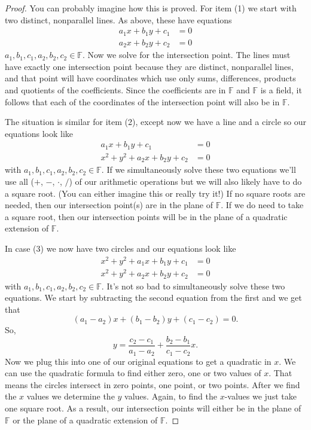 \documentclass[11pt]{article}
\theoremstyle{definition}
\begin{document}
\begin{proof}
 You can probably imagine how this is proved. For item (1) we start with two distinct, nonparallel lines. As above, these have equations
 \begin{align*}
   a_1x+b_1y+c_1&=0\\
   a_2x+b_2y+c_2&=0
 \end{align*}
 $a_1,b_1,c_1,a_2,b_2,c_2\in\mathbb{F}$. Now we solve for the intersection point. The lines must have exactly one intersection point because they are
 distinct, nonparallel lines, and that point will have coordinates which use only sums, differences, products and quotients of the coefficients. Since
 the coefficients are in $\mathbb{F}$ and $\mathbb{F}$ is a field, it follows that each of the coordinates of the intersection point will also be
 in $\mathbb{F}$.

 The situation is similar for item (2), except now we have a line and a circle so our equations look like
 \begin{align*}
   a_1x+b_1y+c_1&=0\\
   x^2 + y^2 + a_2x + b_2y +c_2 &= 0
 \end{align*}
 with $a_1,b_1,c_1,a_2,b_2,c_2\in\mathbb{F}$. If we simultaneously solve these two equations we'll use all ($+$, $-$, $\cdot$, $/$) of our arithmetic operations
 but we will also likely have to do a square root. (You can either imagine this or really try it!) If no square roots are needed, then our intersection
 point(s) are in the plane of $\mathbb{F}$. If we do need to take a square root, then our intersection points will be in the plane of a quadratic 
 extension of $\mathbb{F}$.

 In case (3) we now have two circles and our equations look like
 \begin{align*}
   x^2 + y^2 + a_1x + b_1y +c_1 &= 0\\
   x^2 + y^2 + a_2x + b_2y +c_2 &= 0
 \end{align*}
 with $a_1,b_1,c_1,a_2,b_2,c_2\in\mathbb{F}$. It's not so bad to simultaneously solve these two equations. We start by subtracting the second equation from the
 first and we get that 
 \[ (a_1-a_2)x + (b_1-b_2)y + (c_1-c_2) = 0.\]
 So, 
 \[ y = \frac{c_2-c_1}{a_1-a_2} + \frac{b_2-b_1}{c_1-c_2}x.\]
 Now we plug this into one of our original equations to get a quadratic in $x$. We can use the quadratic formula to find either zero, one or two values of $x$.
 That means the circles intersect in zero points, one point, or two points. After we find the $x$ values we determine the $y$ values. Again, to find the
 $x$-values we just take one square root. As a result, our intersection points will either be in the plane of $\mathbb{F}$ or the plane of a 
 quadratic extension of $\mathbb{F}$.
 \end{proof}
\end{document}
